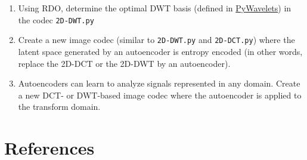 \begin{enumerate}
\item Using RDO, determine the optimal DWT basis (defined in
  \href{https://pywavelets.readthedocs.io/en/latest/}{PyWavelets}) in
  the codec \texttt{2D-DWT.py}
\item Create a new image codec (similar to \texttt{2D-DWT.py} and
  \texttt{2D-DCT.py}) where the latent space generated by an
  autoencoder is entropy encoded (in other words, replace the 2D-DCT
  or the 2D-DWT by an autoencoder).
\item Autoencoders can learn to analyze signals represented in any
  domain. Create a new DCT- or DWT-based image codec where the
  autoencoder is applied to the transform domain.
\end{enumerate}


\section{References}

\renewcommand{\addcontentsline}[3]{}%



